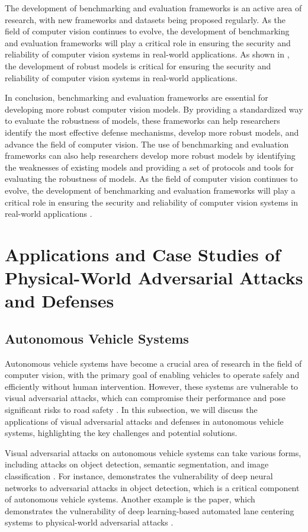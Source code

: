 \documentclass[11pt]{article}
\begin{document}
The development of benchmarking and evaluation frameworks is an active area of research, with new frameworks and datasets being proposed regularly. As the field of computer vision continues to evolve, the development of benchmarking and evaluation frameworks will play a critical role in ensuring the security and reliability of computer vision systems in real-world applications. As shown in \cite{ref162}, the development of robust models is critical for ensuring the security and reliability of computer vision systems in real-world applications.

In conclusion, benchmarking and evaluation frameworks are essential for developing more robust computer vision models. By providing a standardized way to evaluate the robustness of models, these frameworks can help researchers identify the most effective defense mechanisms, develop more robust models, and advance the field of computer vision. The use of benchmarking and evaluation frameworks can also help researchers develop more robust models by identifying the weaknesses of existing models and providing a set of protocols and tools for evaluating the robustness of models. As the field of computer vision continues to evolve, the development of benchmarking and evaluation frameworks will play a critical role in ensuring the security and reliability of computer vision systems in real-world applications \cite{ref175}.

\section{Applications and Case Studies of Physical-World Adversarial Attacks and Defenses}

\subsection{Autonomous Vehicle Systems}

Autonomous vehicle systems have become a crucial area of research in the field of computer vision, with the primary goal of enabling vehicles to operate safely and efficiently without human intervention. However, these systems are vulnerable to visual adversarial attacks, which can compromise their performance and pose significant risks to road safety \cite{ref196}. In this subsection, we will discuss the applications of visual adversarial attacks and defenses in autonomous vehicle systems, highlighting the key challenges and potential solutions.

Visual adversarial attacks on autonomous vehicle systems can take various forms, including attacks on object detection, semantic segmentation, and image classification \cite{ref63}. For instance, \cite{ref197} demonstrates the vulnerability of deep neural networks to adversarial attacks in object detection, which is a critical component of autonomous vehicle systems. Another example is the \cite{ref198} paper, which demonstrates the vulnerability of deep learning-based automated lane centering systems to physical-world adversarial attacks \cite{ref198}.
\end{document}
